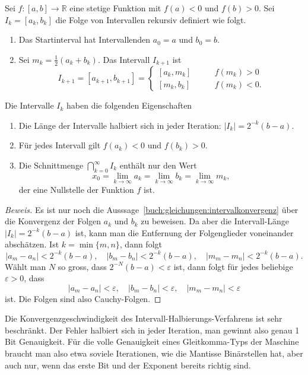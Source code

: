 \begin{satz}[Intervallhalbierung]
Sei $f\colon[a,b]\to\mathbb R$ eine stetige Funktion mit $f(a)<0$ und
$f(b)>0$.
Sei $I_k=[a_k,b_k]$ die Folge von Intervallen rekursiv definiert wie folgt.
\begin{enumerate}
\item
Das Startinterval hat Intervallenden $a_0=a$ und $b_0=b$.
\item
Sei $m_k = \frac12(a_k+b_k)$.
Das Intervall $I_{k+1}$ ist 
\[
I_{k+1} = [a_{k+1},b_{k+1}] = 
\begin{cases}
[a_k,m_k]&\qquad f(m_k) > 0\\[5pt]
[m_k,b_k]&\qquad f(m_k) < 0.
\end{cases}
\]
\end{enumerate}
Die Intervalle $I_k$ haben die folgenden Eigenschaften
\begin{enumerate}
\item
Die Länge der Intervalle halbiert sich in jeder Iteration: $|I_k|=2^{-k}(b-a)$.
\item
Für jedes Intervall gilt $f(a_k)<0$ und $f(b_k)> 0$.
\item
Die Schnittmenge
$\bigcap_{k=0}^\infty I_k$ enthält nur den Wert
\begin{equation}
x_0 = \lim_{k\to\infty}a_k=\lim_{k\to\infty}b_k=\lim_{k\to\infty}m_k,
\label{buch:gleichungen:intervalkonvergenz}
\end{equation}
der eine Nullstelle der Funktion $f$ ist.
\end{enumerate}
\end{satz}

\begin{proof}[Beweis]
Es ist nur noch die Ausssage~\eqref{buch:gleichungen:intervalkonvergenz}
über die Konvergenz der Folgen $a_k$ und $b_k$
zu beweisen.
Da aber die Intervall-Länge $|I_k|=2^{-k}(b-a)$ ist, kann man die
Entfernung der Folgenglieder voneinander abschätzen.
Ist $k=\min\{m,n\}$, dann folgt
\[
|a_m-a_n| < 2^{-k}(b-a),\quad
|b_m-b_n| < 2^{-k}(b-a),\quad
|m_m-m_n| < 2^{-k}(b-a).
\]
Wählt man $N$ so gross, dass $2^{-N}(b-a)<\varepsilon$ ist, dann
folgt für jedes beliebige $\varepsilon>0$, dass 
\[
|a_m-a_n|<\varepsilon,\quad
|b_m-b_n|<\varepsilon,\quad
|m_m-m_n|<\varepsilon
\]
ist.
Die Folgen sind also Cauchy-Folgen.
\end{proof}

Die Konvergenzgeschwindigkeit des Intervall-Halbierungs-Verfahrens ist
sehr beschränkt.
Der Fehler halbiert sich in jeder Iteration, man gewinnt also genau
1 Bit Genauigkeit.
Für die volle Genauigkeit eines Gleitkomma-Typs der Maschine braucht
man also etwa soviele Iterationen, wie die Mantisse Binärstellen hat,
aber auch nur, wenn das erste Bit und der Exponent bereits richtig
sind.

